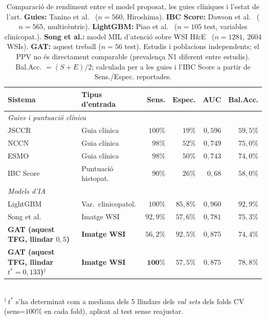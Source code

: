 \documentclass[10pt,a4paper,twocolumn,twoside]{article}
\begin{document}
\begin{table}[h]
\centering
\caption{Comparació de rendiment entre el model proposat, les guies clíniques i l'estat
de l'art. \textbf{Guies:} Tanino et al.~\cite{tanino2024comparative} ($n\!=\!560$, Hiroshima).
\textbf{IBC Score:} Dawson et al.~\cite{dawson2024budding} ($n\!=\!565$, multicèntric).
\textbf{LightGBM:} Piao et al.~\cite{piao2023ai} ($n\!=\!105$ test, variables clinicopat.).
\textbf{Song et al.:} model MIL d'atenció sobre WSI H\&E~\cite{song2024lnm} ($n\!=\!1281$, $2604$ WSIs).
\textbf{GAT:} aquest treball ($n\!=\!56$ test).
Estudis i poblacions independents; el PPV no és directament comparable
(prevalença N1 diferent entre estudis).
Bal.Acc. $= (S\!+\!E)/2$; calculada per a les guies i l'IBC Score a partir de Sens./Espec.
reportades.} %
\label{tab:comparison}
\small
\begin{tabular}{llrrrr}
\toprule
\textbf{Sistema} & \textbf{Tipus d'entrada} & \textbf{Sens.} & \textbf{Espec.} & \textbf{AUC} & \textbf{Bal.Acc.} \\
\midrule
\multicolumn{6}{l}{\textit{Guies i puntuació clínica}} \\[2pt]
JSCCR \cite{jsccr2019}        & Guia clínica  & $100\%$ & $19\%$  & $0{,}596$ & $59{,}5\%$ \\
NCCN                           & Guia clínica  & $98\%$  & $52\%$  & $0{,}749$ & $75{,}0\%$ \\
ESMO \cite{esge2022}           & Guia clínica  & $98\%$  & $50\%$  & $0{,}743$ & $74{,}0\%$ \\
IBC Score \cite{dawson2024budding} & Puntuació histopat. & $90\%$ & $26\%$ & $0{,}68$ & $58{,}0\%$ \\
\midrule
\multicolumn{6}{l}{\textit{Models d'IA}} \\[2pt]
LightGBM \cite{piao2023ai}                          & Var.\ clinicopatol. & $100\%$  & $85{,}8\%$ & $0{,}960$ & $92{,}9\%$ \\
Song et al.\ \cite{song2024lnm}                     & Imatge WSI & $92{,}9\%$ & $57{,}6\%$ & $0{,}781$ & $75{,}3\%$ \\
\textbf{GAT (aquest TFG, llindar $0{,}5$)}          & \textbf{Imatge WSI} & $56{,}2\%$ & $92{,}5\%$ & $0{,}875$ & $74{,}4\%$ \\
\textbf{GAT (aquest TFG, llindar $t^*\!=\!0{,}133$)$^{\dagger}$} & \textbf{Imatge WSI} & $\mathbf{100\%}$ & $57{,}5\%$ & $0{,}875$ & $78{,}8\%$ \\
\bottomrule
\end{tabular}\\[2pt]
\footnotesize{$^{\dagger}$\,$t^*$ s'ha determinat com a mediana dels 5 llindars dels \textit{val sets}
dels folds CV (sens=$100\%$ en cada fold), aplicat al test sense reajustar.}
\end{table}
\end{document}
